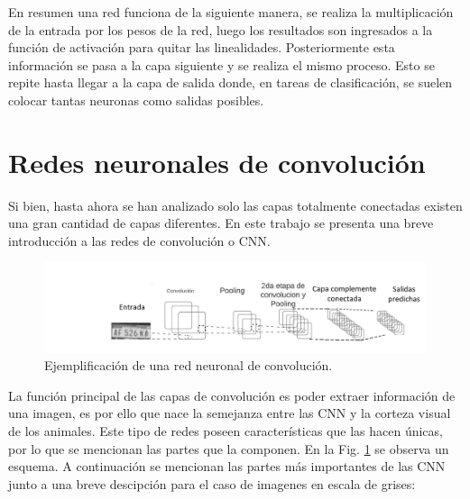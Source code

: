En resumen una red funciona de la siguiente manera, se realiza la multiplicación de la entrada por los pesos de la red, luego los resultados son ingresados a la función de activación para quitar las linealidades. Posteriormente esta información se pasa a la capa siguiente y se realiza el mismo proceso. Esto se repite hasta llegar a la capa de salida donde, en tareas de clasificación, se suelen colocar tantas neuronas como salidas posibles.

\section{Redes neuronales de convolución}

Si bien, hasta ahora se han analizado solo las capas totalmente conectadas existen una gran cantidad de capas diferentes. En este trabajo se presenta una breve introducción a las redes de convolución o CNN.

\begin{figure}[bth]
    \centering
    \includegraphics[width=1\textwidth]{imgs/CNN-completa.png}
    \caption{Ejemplificación de una red neuronal de convolución.}
    \label{fig:esquema-CNN}
\end{figure}

La función principal de las capas de convolución es poder extraer información de una imagen, es por ello que nace la semejanza entre las CNN y la corteza visual de los animales.
Este tipo de redes poseen características que las hacen únicas, por lo que se mencionan las partes que la componen.
En la Fig. \ref{fig:esquema-CNN} se observa un esquema.
A continuación se mencionan las partes más importantes de las CNN junto a una breve descipción para el caso de imagenes en escala de grises:

